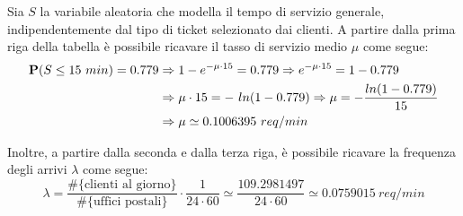 Sia $S$ la variabile aleatoria che modella il tempo di servizio generale, indipendentemente dal tipo di ticket selezionato dai clienti. A partire dalla prima riga della tabella è possibile ricavare il tasso di servizio medio $\mu$ come segue: 
\begin{equation}
\begin{split}
\mathbf{P} (S \leq 15\ min) = 0.779 &\Rightarrow 1 - e^{-\mu\cdot 15} = 0.779 \Rightarrow e^{-\mu\cdot 15} = 1 - 0.779 \\
&\Rightarrow \mu \cdot 15 = -\ ln(1 - 0.779) \Rightarrow \mu = -\frac{ln(1 - 0.779)}{15} \\
&\Rightarrow \mu \simeq 0.1006395\ req/min
\end{split}
\end{equation}

Inoltre, a partire dalla seconda e dalla terza riga, è possibile ricavare la frequenza degli arrivi $\lambda$ come segue:
\begin{equation}
\lambda = \frac{\# \lbrace \text{clienti al giorno} \rbrace}{\# \lbrace \text{uffici postali} \rbrace} \cdot \frac{1}{24 \cdot 60} \simeq \frac{109.2981497}{24 \cdot 60} \simeq 0.0759015\ req/min
\end{equation} 